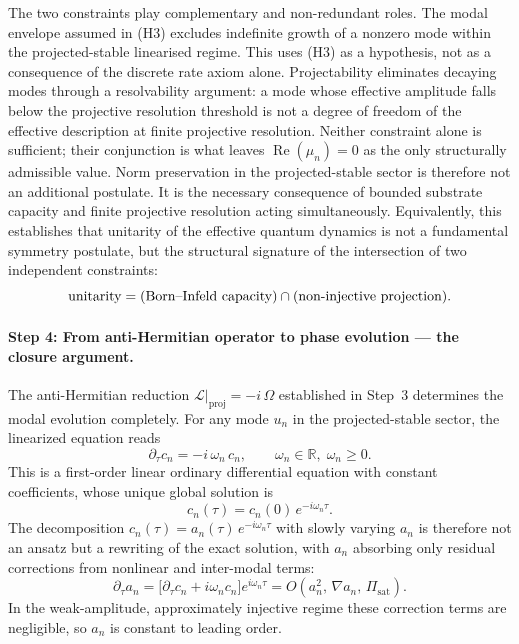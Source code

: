     \begin{remark}
      The two constraints play complementary and non-redundant roles.
      The modal envelope assumed in (H3) excludes indefinite growth of a nonzero mode within the
      projected-stable linearised regime.
      This uses (H3) as a hypothesis, not as a consequence of the discrete rate axiom alone.
      Projectability eliminates decaying modes through a resolvability argument: a mode whose
      effective amplitude falls below the projective resolution threshold is not a degree of freedom
      of the effective description at finite projective resolution.
      Neither constraint alone is sufficient; their conjunction is what leaves
      $\operatorname{Re}(\mu_n) = 0$ as the only structurally admissible value.
      Norm preservation in the projected-stable sector is therefore not an additional postulate.
      It is the necessary consequence of bounded substrate capacity and finite projective resolution
      acting simultaneously.
      Equivalently, this establishes that unitarity of the effective quantum dynamics is not a
      fundamental symmetry postulate, but the structural signature of the intersection of two
      independent constraints:
      \[
        \textup{unitarity}
        = (\textup{Born--Infeld capacity}) \cap (\textup{non-injective projection}).
      \]
      \end{remark}

    \paragraph{Step 4: From anti-Hermitian operator to phase evolution ---
    the closure argument.}

      The anti-Hermitian reduction $\mathcal{L}|_{\mathrm{proj}} = -i\,\Omega$ established
      in Step~3 determines the modal evolution completely.
      For any mode $u_n$ in the projected-stable sector, the linearized equation reads
      \[
        \partial_\tau c_n = -i\,\omega_n\,c_n,
        \qquad \omega_n \in \mathbb{R},\; \omega_n \geq 0.
      \]
      This is a first-order linear ordinary differential equation with constant coefficients,
      whose unique global solution is
      \[
        c_n(\tau) = c_n(0)\,e^{-i\omega_n\tau}.
      \]
      The decomposition $c_n(\tau) = a_n(\tau)\,e^{-i\omega_n\tau}$ with slowly varying
      $a_n$ is therefore not an ansatz but a rewriting of the exact solution, with $a_n$
      absorbing only residual corrections from nonlinear and inter-modal terms:
      \[
        \partial_\tau a_n
        = \bigl[\partial_\tau c_n + i\omega_n c_n\bigr] e^{i\omega_n\tau}
        = O\!\left(a_n^2,\,\nabla a_n,\,\Pi_{\mathrm{sat}}\right).
      \]
      In the weak-amplitude, approximately injective regime these correction terms are
      negligible, so $a_n$ is constant to leading order.

